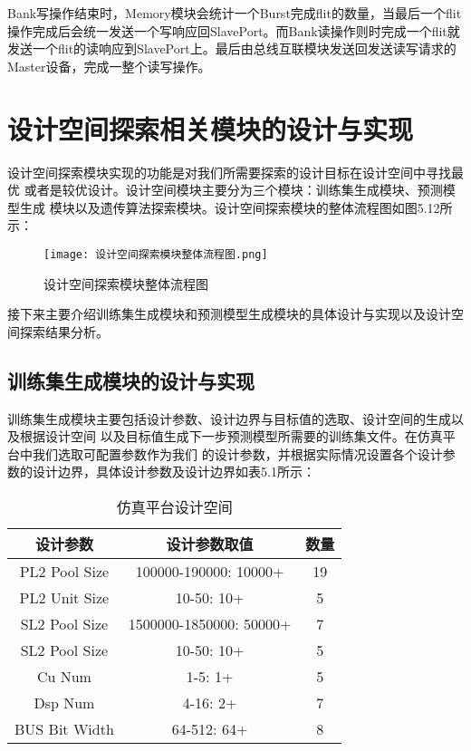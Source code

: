 Bank写操作结束时，Memory模块会统计一个Burst完成flit的数量，当最后一个flit
操作完成后会统一发送一个写响应回SlavePort。而Bank读操作则时完成一个flit就
发送一个flit的读响应到SlavePort上。最后由总线互联模块发送回发送读写请求的
Master设备，完成一整个读写操作。

\section{设计空间探索相关模块的设计与实现}

设计空间探索模块实现的功能是对我们所需要探索的设计目标在设计空间中寻找最优
或者是较优设计。设计空间模块主要分为三个模块：训练集生成模块、预测模型生成
模块以及遗传算法探索模块。设计空间探索模块的整体流程图如图5.12所示：

\begin{figure}
    \centering
    \texttt{[image: 设计空间探索模块整体流程图.png]}
    \caption{设计空间探索模块整体流程图}
    \label{fig:badge}
\end{figure}

接下来主要介绍训练集生成模块和预测模型生成模块的具体设计与实现以及设计空间探索结果分析。

\subsection{训练集生成模块的设计与实现}

训练集生成模块主要包括设计参数、设计边界与目标值的选取、设计空间的生成以及根据设计空间
以及目标值生成下一步预测模型所需要的训练集文件。在仿真平台中我们选取可配置参数作为我们
的设计参数，并根据实际情况设置各个设计参数的设计边界，具体设计参数及设计边界如表5.1所示：

\begin{table}[!h]
    \centering\normalsize
    \caption{仿真平台设计空间}
    \begin{tabular}{c|c|c}
    \hline
    \textbf{设计参数} & \textbf{设计参数取值}         & \textbf{数量} \\ \hline
    PL2 Pool Size & 100000-190000: 10000+   & 19          \\ \hline
    PL2 Unit Size & 10-50: 10+              & 5           \\ \hline
    SL2 Pool Size & 1500000-1850000: 50000+ & 7           \\ \hline
    SL2 Pool Size & 10-50: 10+              & 5           \\ \hline
    Cu Num        & 1-5: 1+                 & 5           \\ \hline
    Dsp Num       & 4-16: 2+                & 7           \\ \hline
    BUS Bit Width & 64-512: 64+             & 8           \\ \hline
    \end{tabular}
    \end{table}

